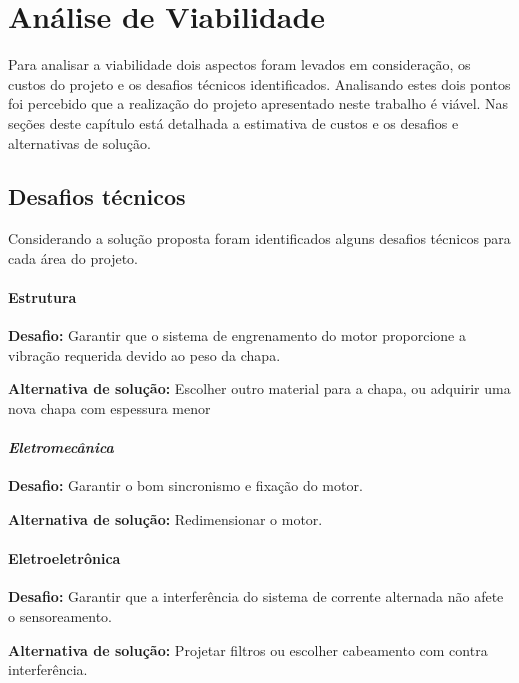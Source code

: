 \chapter{Análise de Viabilidade}

Para analisar a viabilidade dois aspectos foram levados em consideração, os custos do projeto e os desafios técnicos identificados. Analisando estes dois pontos foi percebido que a realização do projeto apresentado neste trabalho é viável. Nas seções deste capítulo está detalhada a estimativa de custos e os desafios e alternativas de solução.  



\section{Desafios técnicos}

Considerando a solução proposta foram identificados alguns desafios técnicos para cada área do projeto.

\subsubsection*{\textbf{Estrutura}}
\textbf{Desafio:} Garantir que o sistema de engrenamento do motor proporcione a vibração requerida devido ao peso da chapa.

\textbf{Alternativa de solução:}
Escolher outro material para a chapa, ou adquirir uma nova chapa com espessura menor

\subsubsection*{\textit{Eletromecânica}}
\textbf{Desafio:}
Garantir o bom sincronismo e fixação do motor.

\textbf{Alternativa de solução:}
Redimensionar o motor.

\subsubsection*{\textbf{Eletroeletrônica}}
\textbf{Desafio:}
Garantir que a interferência do sistema de corrente alternada não afete o sensoreamento.

\textbf{Alternativa de solução:}
Projetar filtros ou escolher cabeamento com contra interferência.

